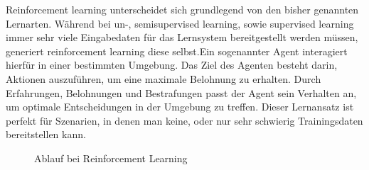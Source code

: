 Reinforcement learning unterscheidet sich grundlegend von den bisher genannten
Lernarten. Während bei un-, semisupervised learning, sowie supervised learning
immer sehr viele Eingabedaten für das Lernsystem bereitgestellt werden müssen,
generiert reinforcement learning diese selbst.Ein sogenannter Agent interagiert
hierfür in einer bestimmten Umgebung. Das Ziel des Agenten besteht darin,
Aktionen auszuführen, um eine maximale Belohnung zu erhalten. Durch
Erfahrungen, Belohnungen und Bestrafungen passt der Agent sein Verhalten an, um
optimale Entscheidungen in der Umgebung zu treffen. Dieser Lernansatz ist
perfekt für Szenarien, in denen man keine, oder nur sehr schwierig
Trainingsdaten bereitstellen kann. \cite{lanquillon2019grundzuge}

\begin{figure}[h]
    \centering
    
    \caption[width=0.4\textwidth]{Ablauf bei Reinforcement Learning}
    \label{fig:disreinforcementlearning}
\end{figure}